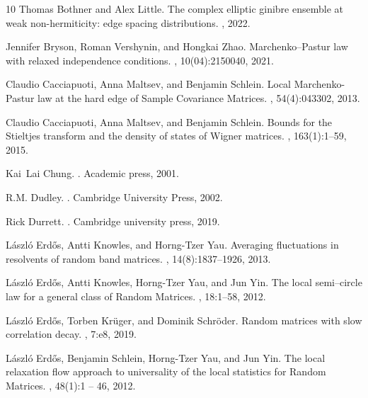 \documentclass[11pt, a4paper, oneside]{book}
\numberwithin{equation}{chapter}
\begin{document}
\begin{thebibliography}{10}
Thomas Bothner and Alex Little.
\newblock The complex elliptic ginibre ensemble at weak non-hermiticity: edge spacing distributions.
, 2022.

Jennifer Bryson, Roman Vershynin, and Hongkai Zhao.
\newblock Marchenko--{P}astur law with relaxed independence conditions.
, 10(04):2150040, 2021.

Claudio Cacciapuoti, Anna Maltsev, and Benjamin Schlein.
\newblock Local {M}archenko-{P}astur law at the hard edge of {S}ample {C}ovariance {M}atrices.
, 54(4):043302, 2013.

Claudio Cacciapuoti, Anna Maltsev, and Benjamin Schlein.
\newblock Bounds for the {S}tieltjes transform and the density of states of {W}igner matrices.
, 163(1):1--59, 2015.

Kai~Lai Chung.
.
\newblock Academic press, 2001.

R.M. Dudley.
.
\newblock Cambridge University Press, 2002.

Rick Durrett.
.
\newblock Cambridge university press, 2019.

L{\'a}szl{\'o} Erd{\H{o}}s, Antti Knowles, and Horng-Tzer Yau.
\newblock Averaging fluctuations in resolvents of random band matrices.
, 14(8):1837--1926, 2013.

L{\'a}szl{\'o} Erd{\H{o}}s, Antti Knowles, Horng-Tzer Yau, and Jun Yin.
\newblock The local semi--circle law for a general class of {R}andom {M}atrices.
, 18:1--58, 2012.

L{\'a}szl{\'o} Erd{\H{o}}s, Torben Kr{\"u}ger, and Dominik Schr{\"o}der.
\newblock Random matrices with slow correlation decay.
, 7:e8, 2019.

L{\'a}szl{\'o} Erd{\H{o}}s, Benjamin Schlein, Horng-Tzer Yau, and Jun Yin.
\newblock The local relaxation flow approach to universality of the local statistics for {R}andom {M}atrices.
, 48(1):1 -- 46, 2012.


\end{thebibliography}
\end{document}
